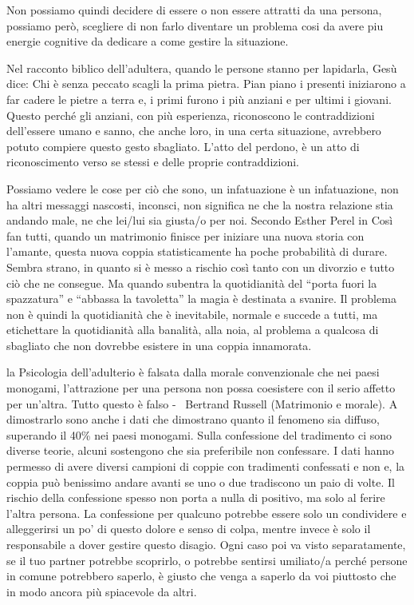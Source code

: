 \documentclass[12pt]{book} %
\begin{document}
Non possiamo quindi decidere di essere o non essere attratti da una persona, possiamo però, scegliere di non farlo
diventare un problema cosi da avere piu energie cognitive da dedicare a come gestire la situazione.

Nel racconto biblico dell'adultera, quando le persone stanno per lapidarla, Gesù dice: Chi è senza peccato scagli la
prima pietra. Pian piano i presenti iniziarono a far cadere le pietre a terra e, i primi furono i più anziani e per
ultimi i giovani. Questo perché gli anziani, con più esperienza, riconoscono le contraddizioni
dell'essere umano e sanno, che anche loro, in una certa situazione, avrebbero potuto compiere
questo gesto sbagliato. L'atto del perdono, è un atto di riconoscimento verso se stessi e delle proprie contraddizioni.

Possiamo vedere le cose per ciò che sono, un infatuazione è
un infatuazione, non ha altri messaggi nascosti, inconsci, non significa ne che la nostra relazione stia andando male,
ne che lei/lui sia giusta/o per noi. Secondo Esther Perel in Così fan
tutti, quando un matrimonio finisce per iniziare una nuova storia con
l'amante, questa nuova coppia statisticamente ha poche probabilità di durare. Sembra strano, in
quanto si è messo a rischio così tanto con un divorzio e tutto ciò che ne consegue. Ma quando subentra la quotidianità
del “porta fuori la spazzatura” e “abbassa la tavoletta” la magia è destinata a svanire. Il problema non è quindi la
quotidianità che è inevitabile, normale e succede a tutti, ma etichettare la quotidianità alla banalità, alla noia, al
problema a qualcosa di sbagliato che non dovrebbe esistere in una coppia
innamorata.

la Psicologia dell'adulterio è falsata dalla morale convenzionale che nei paesi monogami,
l'attrazione per una persona non possa coesistere con il serio affetto per
un'altra. Tutto questo è falso - \ Bertrand Russell (Matrimonio e
morale).
A dimostrarlo sono anche i dati che dimostrano quanto il fenomeno sia diffuso, superando il 40\% nei paesi monogami.
Sulla confessione del tradimento ci sono diverse teorie, alcuni sostengono che sia preferibile non confessare. I dati hanno permesso di avere diversi campioni di coppie con tradimenti confessati e non e, la coppia può benissimo andare avanti se uno o due tradiscono un paio di volte. Il rischio della confessione spesso non porta a nulla di positivo, ma solo al ferire l'altra persona. La confessione per qualcuno potrebbe essere solo un condividere e alleggerirsi un po' di questo dolore e senso di colpa, mentre invece è solo il responsabile a dover gestire questo disagio. 
Ogni caso poi va visto separatamente, se il tuo partner potrebbe scoprirlo, o potrebbe sentirsi umiliato/a perché persone in comune potrebbero saperlo, è giusto che venga a saperlo da voi piuttosto che in modo ancora più spiacevole da altri.
\end{document}
